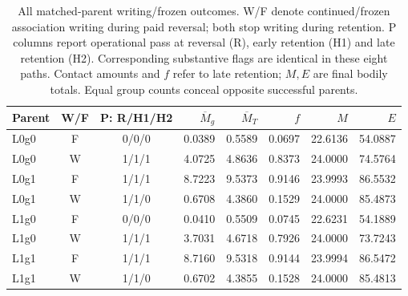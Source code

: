 \begin{table}[htbp]\centering\scriptsize
\caption{All matched-parent writing/frozen outcomes. W/F denote continued/frozen association writing during paid reversal; both stop writing during retention. P columns report operational pass at reversal (R), early retention (H1) and late retention (H2). Corresponding substantive flags are identical in these eight paths. Contact amounts and $f$ refer to late retention; $M,E$ are final bodily totals. Equal group counts conceal opposite successful parents.}\label{tab:coordinated-outcomes}
\setlength{\tabcolsep}{3.5pt}\begin{tabular}{lccrrrrr}\toprule
Parent & W/F & P: R/H1/H2 & $\overline M_g$ & $\overline M_T$ & $f$ & $M$ & $E$\\\midrule
L0g0 & F & 0/0/0 & 0.0389 & 0.5589 & 0.0697 & 22.6136 & 54.0887 \\
L0g0 & W & 1/1/1 & 4.0725 & 4.8636 & 0.8373 & 24.0000 & 74.5764 \\
L0g1 & F & 1/1/1 & 8.7223 & 9.5373 & 0.9146 & 23.9993 & 86.5532 \\
L0g1 & W & 1/1/0 & 0.6708 & 4.3860 & 0.1529 & 24.0000 & 85.4873 \\
L1g0 & F & 0/0/0 & 0.0410 & 0.5509 & 0.0745 & 22.6231 & 54.1889 \\
L1g0 & W & 1/1/1 & 3.7031 & 4.6718 & 0.7926 & 24.0000 & 73.7243 \\
L1g1 & F & 1/1/1 & 8.7160 & 9.5318 & 0.9144 & 23.9994 & 86.5472 \\
L1g1 & W & 1/1/0 & 0.6702 & 4.3855 & 0.1528 & 24.0000 & 85.4813 \\
\bottomrule\end{tabular}\end{table}\FloatBarrier

